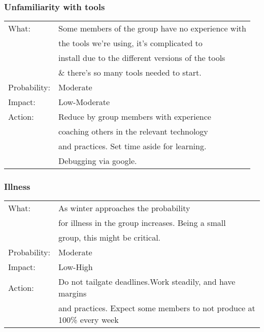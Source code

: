 \subsubsection{Unfamiliarity with tools}
\begin{tabular}{| l | l |}
	\hline
	What: & Some members of the group have no experience with\\
	& the tools we're using, it's complicated to\\
	& install due to the different versions of the tools \\
	& \& there's so many tools needed to start.\\
	\hline
	Probability: & Moderate \\
	\hline
	Impact: & Low-Moderate \\
	\hline
	Action: & Reduce by group members with experience \\
	& coaching others in the relevant technology\\
	& and practices. Set time aside for learning.\\
	& Debugging via google.\\
	\hline

\end{tabular}




\subsubsection{Illness}
\begin{tabular}{| l | l |}
	\hline
	What: & As winter approaches the probability\\ 	&for illness in the group increases. Being a small\\ 	&group, this might be critical.\\
	\hline
	Probability: & Moderate \\
	\hline
	Impact: & Low-High \\
	\hline
	Action: & Do not tailgate deadlines.Work steadily, and have margins\\
	&and practices. Expect some members to not produce at 100\% every week\\
	\hline

\end{tabular}

